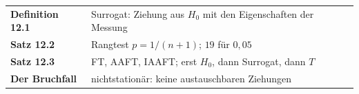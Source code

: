 \begin{merksatz}
\begin{center}
\renewcommand{\arraystretch}{1.5}
\begin{tabular}{@{}P{3.0cm}P{5.6cm}@{}}
\toprule
\textbf{Definition 12.1} & Surrogat: Ziehung aus $H_0$ mit den Eigenschaften der Messung\\
\textbf{Satz 12.2} & Rangtest $p = 1/(n+1)$; $19$ für $0{,}05$\\
\textbf{Satz 12.3} & FT, AAFT, IAAFT; erst $H_0$, dann Surrogat, dann $T$\\
\textbf{Der Bruchfall} & nichtstationär: keine austauschbaren Ziehungen\\
\bottomrule
\end{tabular}
\end{center}

\begin{center}
\begin{minipage}{0.88\textwidth}
\end{minipage}
\end{center}
\end{merksatz}

